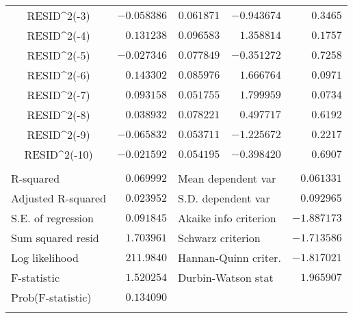 \begin{tabular}{lrrrr}
\multicolumn{1}{c}{RESID\textasciicircum 2(-3)}&\multicolumn{1}{r}{$-0.058386$}&\multicolumn{1}{r}{$0.061871$}&\multicolumn{1}{r}{$-0.943674$}&\multicolumn{1}{r}{$0.3465$}\\
\multicolumn{1}{c}{RESID\textasciicircum 2(-4)}&\multicolumn{1}{r}{$0.131238$}&\multicolumn{1}{r}{$0.096583$}&\multicolumn{1}{r}{$1.358814$}&\multicolumn{1}{r}{$0.1757$}\\
\multicolumn{1}{c}{RESID\textasciicircum 2(-5)}&\multicolumn{1}{r}{$-0.027346$}&\multicolumn{1}{r}{$0.077849$}&\multicolumn{1}{r}{$-0.351272$}&\multicolumn{1}{r}{$0.7258$}\\
\multicolumn{1}{c}{RESID\textasciicircum 2(-6)}&\multicolumn{1}{r}{$0.143302$}&\multicolumn{1}{r}{$0.085976$}&\multicolumn{1}{r}{$1.666764$}&\multicolumn{1}{r}{$0.0971$}\\
\multicolumn{1}{c}{RESID\textasciicircum 2(-7)}&\multicolumn{1}{r}{$0.093158$}&\multicolumn{1}{r}{$0.051755$}&\multicolumn{1}{r}{$1.799959$}&\multicolumn{1}{r}{$0.0734$}\\
\multicolumn{1}{c}{RESID\textasciicircum 2(-8)}&\multicolumn{1}{r}{$0.038932$}&\multicolumn{1}{r}{$0.078221$}&\multicolumn{1}{r}{$0.497717$}&\multicolumn{1}{r}{$0.6192$}\\
\multicolumn{1}{c}{RESID\textasciicircum 2(-9)}&\multicolumn{1}{r}{$-0.065832$}&\multicolumn{1}{r}{$0.053711$}&\multicolumn{1}{r}{$-1.225672$}&\multicolumn{1}{r}{$0.2217$}\\
\multicolumn{1}{c}{RESID\textasciicircum 2(-10)}&\multicolumn{1}{r}{$-0.021592$}&\multicolumn{1}{r}{$0.054195$}&\multicolumn{1}{r}{$-0.398420$}&\multicolumn{1}{r}{$0.6907$}\\
[4.5pt] \hline \\ [-4.5pt]
\multicolumn{1}{l}{R-squared}&\multicolumn{1}{r}{$0.069992$}&\multicolumn{2}{l}{Mean dependent var}&\multicolumn{1}{r}{$0.061331$}\\
\multicolumn{1}{l}{Adjusted R-squared}&\multicolumn{1}{r}{$0.023952$}&\multicolumn{2}{l}{S.D. dependent var}&\multicolumn{1}{r}{$0.092965$}\\
\multicolumn{1}{l}{S.E. of regression}&\multicolumn{1}{r}{$0.091845$}&\multicolumn{2}{l}{Akaike info criterion}&\multicolumn{1}{r}{$-1.887173$}\\
\multicolumn{1}{l}{Sum squared resid}&\multicolumn{1}{r}{$1.703961$}&\multicolumn{2}{l}{Schwarz criterion}&\multicolumn{1}{r}{$-1.713586$}\\
\multicolumn{1}{l}{Log likelihood}&\multicolumn{1}{r}{$211.9840$}&\multicolumn{2}{l}{Hannan-Quinn criter.}&\multicolumn{1}{r}{$-1.817021$}\\
\multicolumn{1}{l}{F-statistic}&\multicolumn{1}{r}{$1.520254$}&\multicolumn{2}{l}{Durbin-Watson stat}&\multicolumn{1}{r}{$1.965907$}\\
\multicolumn{1}{l}{Prob(F-statistic)}&\multicolumn{1}{r}{$0.134090$}&\multicolumn{1}{c}{}&\multicolumn{1}{c}{}&\multicolumn{1}{c}{}\\
[4.5pt] \hline \\ [-4.5pt]
\end{tabular}

